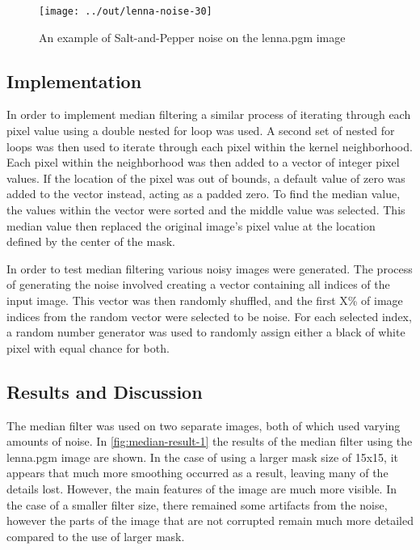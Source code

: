 \documentclass[headings=optiontoheadandtoc,listof=totoc,parskip=full]{scrartcl}
\begin{document}
\begin{figure}[H]
	\centering
	\texttt{[image: ../out/lenna-noise-30]}
	\caption{An example of Salt-and-Pepper noise on the lenna.pgm image}
	\label{fig:noise-example-1}
\end{figure}

\subsection{Implementation}
\label{sec:median-implementation}

In order to implement median filtering a similar process of iterating through each pixel value using a double nested for loop was used. A second set of nested for loops was then used to iterate through each pixel within the kernel neighborhood. Each pixel within the neighborhood was then added to a vector of integer pixel values. If the location of the pixel was out of bounds, a default value of zero was added to the vector instead, acting as a padded zero. To find the median value, the values within the vector were sorted and the middle value was selected. This median value then replaced the original image’s pixel value at the location defined by the center of the mask. 

In order to test median filtering various noisy images were generated. The process of generating the noise involved creating a vector containing all indices of the input image. This vector was then randomly shuffled, and the first X\% of image indices from the random vector were selected to be noise. For each selected index, a random number generator was used to randomly assign either a black of white pixel with equal chance for both.



\subsection{Results and Discussion}
\label{sec:median-results}

The median filter was used on two separate images, both of which used varying amounts of noise. In \cref{fig:median-result-1} the results of the median filter using the lenna.pgm image are shown. In the case of using a larger mask size of 15x15, it appears that much more smoothing occurred as a result, leaving many of the details lost. However, the main features of the image are much more visible. In the case of a smaller filter size, there remained some artifacts from the noise, however the parts of the image that are not corrupted remain much more detailed compared to the use of larger mask.
\end{document}
